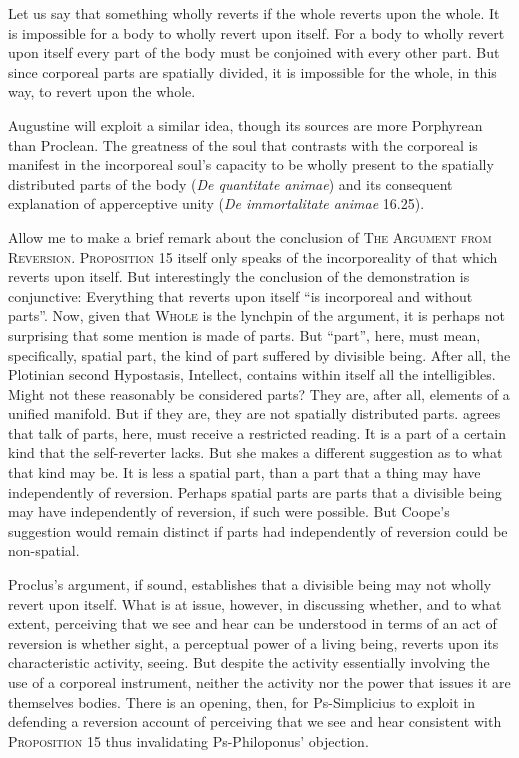 Let us say that something wholly reverts if the whole reverts upon the whole. It is impossible for a body to wholly revert upon itself. For a body to wholly revert upon itself every part of the body must be conjoined with every other part. But since corporeal parts are spatially divided, it is impossible for the whole, in this way, to revert upon the whole. 

Augustine will exploit a similar idea, though its sources are more Porphyrean than Proclean. The greatness of the soul that contrasts with the corporeal is manifest in the incorporeal soul's capacity to be wholly present to the spatially distributed parts of the body (\emph{De quantitate animae}) and its consequent explanation of apperceptive unity (\emph{De immortalitate animae} 16.25).

Allow me to make a brief remark about the conclusion of \textsc{The Argument from Reversion}. \textsc{Proposition} 15 itself only speaks of the incorporeality of that which reverts upon itself. But interestingly the conclusion of the demonstration is conjunctive: Everything that reverts upon itself ``is incorporeal and without parts''. Now, given that \textsc{Whole} is the lynchpin of the argument, it is perhaps not surprising that some mention is made of parts. But ``part'', here, must mean, specifically, spatial part, the kind of part suffered by divisible being. After all, the Plotinian second Hypostasis, Intellect, contains within itself all the intelligibles. Might not these reasonably be considered parts? They are, after all, elements of a unified manifold. But if they are, they are not spatially distributed parts. \citet[130]{Coope:2020aa} agrees that talk of parts, here, must receive a restricted reading. It is a part of a certain kind that the self-reverter lacks. But she makes a different suggestion as to what that kind may be. It is less a spatial part, than a part that a thing may have independently of reversion. Perhaps spatial parts are parts that a divisible being may have independently of reversion, if such were possible. But Coope's suggestion would remain distinct if parts had independently of reversion could be non-spatial. 

Proclus's argument, if sound, establishes that a divisible being may not wholly revert upon itself. What is at issue, however, in discussing whether, and to what extent, perceiving that we see and hear can be understood in terms of an act of reversion is whether sight, a perceptual power of a living being, reverts upon its characteristic activity, seeing. But despite the activity essentially involving the use of a corporeal instrument, neither the activity nor the power that issues it are themselves bodies. There is an opening, then, for Ps-Simplicius to exploit in defending a reversion account of perceiving that we see and hear consistent with \textsc{Proposition} 15 thus invalidating Ps-Philoponus' objection.

